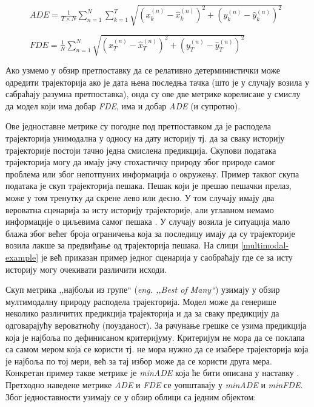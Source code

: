 \documentclass[11pt,oneside]{memoir}
\begin{document}
\begin{figure}[H]
  \centering
  $ADE = \frac{1}{T\times N}\sum_{n=1}^{N}\sum_{k=1}^{T}\sqrt{(x^{(n)}_k - \hat{x}^{(n)}_k)^2 + (y^{(n)}_k - \hat{y}^{(n)}_k)^2}$
\end{figure}

\begin{figure}[H]
  \centering
  $FDE = \frac{1}{N}\sum_{n=1}^{N}\sqrt{(x^{(n)}_{T} - \hat{x}^{(n)}_{T})^2 + (y^{(n)}_{T} - \hat{y}^{(n)}_{T})^2}$
\end{figure}

Ако узмемо у обзир претпоставку да се релативно детерминистички може одредити трајекторија ако је дата њена последња тачка 
(што је у случају возила у сабраћају разумна претпоставка), онда су ове две метрике корелисане у смислу да модел 
који има добар \textit{FDE}, има и добар \textit{ADE} (и супротно).

Ове једноставне метрике су погодне под претпоставком да је расподела трајекторија унимодална у односу на дату историју тј. да за сваку историју трајекторије 
постоји тачно једна смислена предикција. 
Скупови података трајекторија могу да имају јачу стохастичку природу због природе самог проблема или због непотпуних информација о окружењу.
Пример таквог скупа података је скуп трајекторија пешака. Пешак који је прешао пешачки прелаз, може у том тренутку да скрене лево или десно.
У том случају имају два вероватна сценарија за исту историју трајекторије, али углавном немамо информације о циљевима самог пешака \cite{social_gan, best_of_many_cvae}. 
У случају возила је ситуација мало блажа због већег броја ограничења која за последицу имају да су трајекторије возила
лакше за предвиђање од трајекторија пешака. На слици \ref{multimodal-example} је већ приказан пример једног сценарија у саобраћају где
се за исту историју могу очекивати различити исходи.

Скуп метрика ,,најбољи из групе`` (\textit{eng. ,,Best of Many``}) узимају у обзир мултимодалну природу расподела трајекторија. Модел може
да генерише неколико различитих предикција трајекторија и да за сваку предикцију да одговарајућу вероватноћу (поузданост). 
За рачунање грешке се узима предикција која је најбоља по дефинисаном критеријуму. Критеријум не мора да се поклапа са самом мером која се користи 
тј. не мора нужно да се изабере трајекторија која је најбоља по тој мери, већ за тај избор може да се користи друга мера. 
Конкретан пример такве метрике је \textit{minADE} која ће бити описана у наставку \cite{best_of_many_cvae, argoverse}. 
Претходно наведене метрике \textit{ADE} и \textit{FDE} се уопштавају у \textit{minADE} и \textit{minFDE}. Због једноставности узимају се у обзир облици
са једним објектом: \cite{Disdis, best_of_many_cvae}
\end{document}
